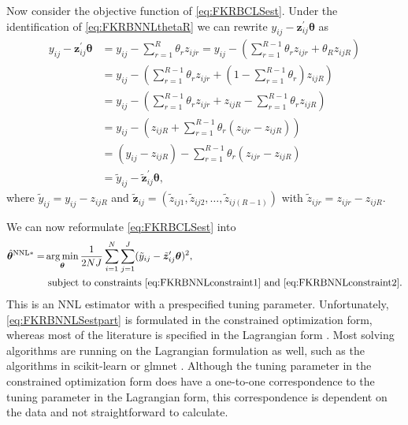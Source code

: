 Now consider the objective function of \cref{eq:FKRBCLSest}.
Under the identification of \cref{eq:FKRBNNLthetaR} we can rewrite $y_{ij} - \bm{z}^\prime_{ij}\bm{\theta}$ as
\begin{align}
    y_{ij} - \bm{z}^\prime_{ij}\bm{\theta} & = y_{ij} - \sum_{r=1}^{R}\theta_r z_{ijr} = y_{ij} - \left(\sum_{r=1}^{R-1}\theta_r z_{ijr} +\theta_R z_{ijR}\right) \\
        &= y_{ij} - \left(\sum_{r=1}^{R-1}\theta_r z_{ijr} +\left(1 - \sum_{r=1}^{R - 1}\theta_r\right) z_{ijR}\right) \\
        &= y_{ij} - \left(\sum_{r=1}^{R-1}\theta_r z_{ijr} +z_{ijR} - \sum_{r=1}^{R - 1}\theta_r z_{ijR}\right) \\
        &= y_{ij} - \left(z_{ijR} + \sum_{r=1}^{R - 1}\theta_r (z_{ijr} -z_{ijR})\right) \\
        &= (y_{ij} - z_{ijR}) - \sum_{r=1}^{R - 1}\theta_r (z_{ijr} -z_{ijR}) \\
        &= \tilde{y}_{ij} - \tilde{\bm{z}}^\prime_{ij}\bm{\theta},
\end{align}
where $\tilde{y}_{ij} = y_{ij} - z_{ijR}$ and $\tilde{\bm{z}}_{ij} = (\tilde{z}_{ij1},\tilde{z}_{ij2},\ldots,\tilde{z}_{ij(R-1)})$ with $\tilde{z}_{ijr} = z_{ijr} -z_{ijR}$.

We can now reformulate \cref{eq:FKRBCLSest} into
\begin{equation}
\label{eq:FKRBNNLSestpart}
    \begin{split}
        \hat{\bm{\theta}}^{\mathrm{NNL*}} = &\operatorname*{arg\,min}_{\bm{\theta}}{\frac{1}{2NJ}\sum_{i=1}^{N}\sum_{j=1}^{J}(\tilde{y}_{ij}-\tilde{\bm{z}}^\prime_{ij}\bm{\theta})^2}, \\
            &\text{ subject to constraints \eqref{eq:FKRBNNLconstraint1} and \eqref{eq:FKRBNNLconstraint2}}.
    \end{split}
\end{equation}
This is an NNL estimator with a prespecified tuning parameter.
Unfortunately, \cref{eq:FKRBNNLSestpart} is formulated in the constrained optimization form, whereas most of the literature is specified in the Lagrangian form \citep[e.g.][]{WuYangLiu2014}.
Most solving algorithms are running on the Lagrangian formulation as well, such as the algorithms in scikit-learn \citep{scikitlearn2011} or glmnet \citep{FriedmanHastieTibshirani2010}.
Although the tuning parameter in the constrained optimization form does have a one-to-one correspondence to the tuning parameter in the Lagrangian form, this correspondence is dependent on the data and not straightforward to calculate.

